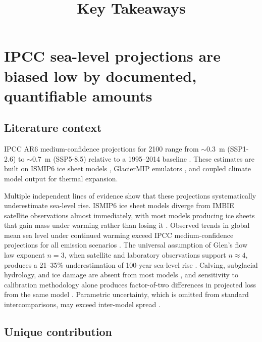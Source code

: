 \documentclass[11pt]{article}
\title{Key Takeaways}
\author{}
\date{}
\begin{document}
\maketitle

\section{IPCC sea-level projections are biased low by documented, quantifiable amounts}
\label{sec:takeaway_bias}

\subsection{Literature context}

IPCC AR6 medium-confidence projections for 2100 range from $\sim$0.3~m (SSP1-2.6) to $\sim$0.7~m (SSP5-8.5) relative to a 1995--2014 baseline \citep{Fox-Kemper2021}. These estimates are built on ISMIP6 ice sheet models \citep{Seroussi2020}, GlacierMIP emulators \citep{Marzeion2020}, and coupled climate model output for thermal expansion.

Multiple independent lines of evidence show that these projections systematically underestimate sea-level rise. ISMIP6 ice sheet models diverge from IMBIE satellite observations almost immediately, with most models producing ice sheets that gain mass under warming rather than losing it \citep{Aschwanden2021, Fricker2025}. Observed trends in global mean sea level under continued warming exceed IPCC medium-confidence projections for all emission scenarios \citep{Hamlington2025}. The universal assumption of Glen's flow law exponent $n = 3$, when satellite and laboratory observations support $n \approx 4$, produces a 21--35\% underestimation of 100-year sea-level rise \citep{Millstein2022, Martin2026, GetraerMorlighem2025, Fan2025}. Calving, subglacial hydrology, and ice damage are absent from most models \citep{Aschwanden2021, Dow2022}, and sensitivity to calibration methodology alone produces factor-of-two differences in projected loss from the same model \citep{Goldberg2026}. Parametric uncertainty, which is omitted from standard intercomparisons, may exceed inter-model spread \citep{Aschwanden2019}.

\subsection{Unique contribution}
\end{document}
